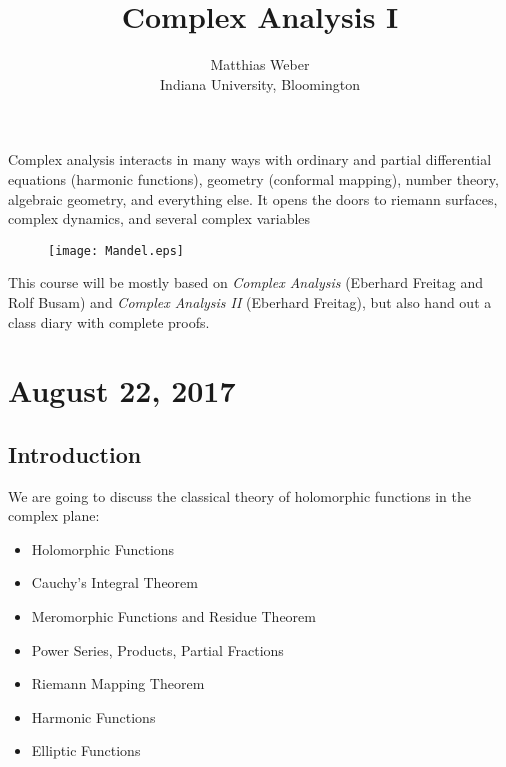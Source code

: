 \documentclass[12pt,reqno]{article}
\title{Complex Analysis I}
\author{Matthias Weber\\
 {\small Indiana University, Bloomington}}
\affil{Notes taken by Aolong Li}
\date{}
\theoremstyle{definition}
\begin{document}
\maketitle

 Complex analysis interacts in many ways with ordinary and partial differential equations
(harmonic functions), geometry (conformal mapping), number theory, algebraic
geometry, and everything else. It opens the doors to riemann surfaces, complex dynamics,
and several complex variables\\ \vspace{3pt}
  
\begin{figure}[h!]
\centering
\texttt{[image: Mandel.eps]}
\footnotemark
\end{figure}


\newpage
 This course will be mostly based on {\it Complex Analysis } (Eberhard Freitag and Rolf Busam)
and {\it Complex Analysis II} (Eberhard Freitag), but also hand out a class diary with complete
proofs.

\tableofcontents

\newpage

\section{August 22, 2017}
\subsection{Introduction}
We are going to discuss the classical theory of holomorphic functions in the complex plane:
\begin{itemize}
    \item Holomorphic Functions
    \item Cauchy’s Integral Theorem
    \item Meromorphic Functions and Residue Theorem
    \item Power Series, Products, Partial Fractions
    \item Riemann Mapping Theorem
    \item Harmonic Functions
    \item Elliptic Functions
\end{itemize}
 
\end{document}
